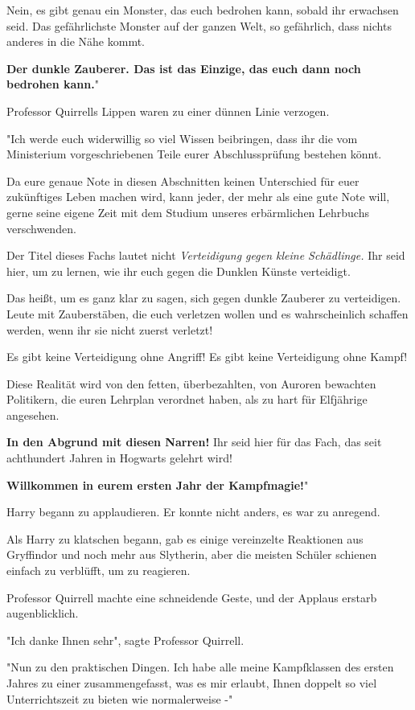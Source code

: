{Nein, es gibt genau ein Monster, das euch bedrohen kann, sobald ihr erwachsen seid. Das gefährlichste Monster auf der ganzen Welt, so gefährlich, dass nichts anderes in die Nähe kommt.

\textbf{\hfill\break Der dunkle Zauberer. Das ist das Einzige, das euch dann noch bedrohen kann.}"

Professor Quirrells Lippen waren zu einer dünnen Linie verzogen.

"Ich werde euch widerwillig so viel Wissen beibringen, dass ihr die vom Ministerium vorgeschriebenen Teile eurer Abschlussprüfung bestehen könnt.

Da eure genaue Note in diesen Abschnitten keinen Unterschied für euer zukünftiges Leben machen wird, kann jeder, der mehr als eine gute Note will, gerne seine eigene Zeit mit dem Studium unseres erbärmlichen Lehrbuchs verschwenden.

Der Titel dieses Fachs lautet nicht \emph{Verteidigung gegen kleine Schädlinge.} Ihr seid hier, um zu lernen, wie ihr euch gegen die Dunklen Künste verteidigt.

Das heißt, um es ganz klar zu sagen, sich gegen dunkle Zauberer zu verteidigen. Leute mit Zauberstäben, die euch verletzen wollen und es wahrscheinlich schaffen werden, wenn ihr sie nicht zuerst verletzt!

Es gibt keine Verteidigung ohne Angriff! Es gibt keine Verteidigung ohne Kampf!

Diese Realität wird von den fetten, überbezahlten, von Auroren bewachten Politikern, die euren Lehrplan verordnet haben, als zu hart für Elfjährige angesehen.

\textbf{In den Abgrund mit diesen Narren!} Ihr seid hier für das Fach, das seit achthundert Jahren in Hogwarts gelehrt wird!

\textbf{Willkommen in eurem ersten Jahr der Kampfmagie!}"

Harry begann zu applaudieren. Er konnte nicht anders, es war zu anregend.

Als Harry zu klatschen begann, gab es einige vereinzelte Reaktionen aus Gryffindor und noch mehr aus Slytherin, aber die meisten Schüler schienen einfach zu verblüfft, um zu reagieren.

Professor Quirrell machte eine schneidende Geste, und der Applaus erstarb augenblicklich.

"Ich danke Ihnen sehr", sagte Professor Quirrell.

"Nun zu den praktischen Dingen. Ich habe alle meine Kampfklassen des ersten Jahres zu einer zusammengefasst, was es mir erlaubt, Ihnen doppelt so viel Unterrichtszeit zu bieten wie normalerweise -"

}
